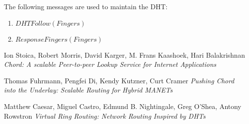 \documentclass{amsart}
\theoremstyle{definition}
\theoremstyle{remark}
\numberwithin{equation}{section}
\begin{document}

The following messages are used to maintain the DHT:
\begin{enumerate}
  \item $DHTFollow(Fingers)$
  \item $ResponseFingers(Fingers)$
\end{enumerate}




\begin{thebibliography}{9}
Ion Stoica, Robert Morris, David Karger, M. Frans Kaashoek, Hari Balakrishnan
\textit{Chord: A scalable Peer-to-peer Lookup Service for Internet Applications}

Thomas Fuhrmann, Pengfei Di, Kendy Kutzner, Curt Cramer
\textit{Pushing Chord into the Underlay: Scalable Routing for Hybrid MANETs}

  Matthew Caesar, Miguel Castro, Edmund B. Nightingale, Greg O'Shea, Antony Rowstron
\textit{Virtual Ring Routing: Network Routing Inspired by DHTs}
\\

\end{thebibliography}
\end{document}
